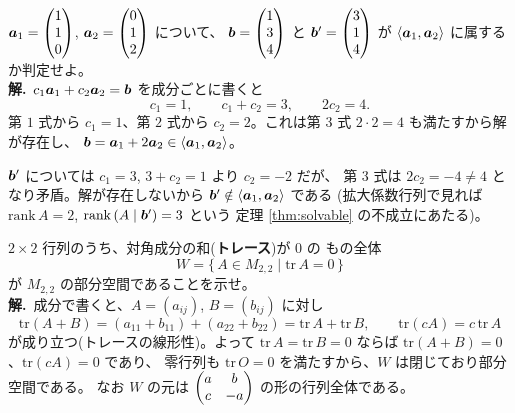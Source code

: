 \begin{rei}[例題・基本(生成された空間に入るか)]\label{rei:sub-member}
$\bm{a}_1 = \begin{pmatrix}1 \\ 1 \\ 0\end{pmatrix}$, $\bm{a}_2 = \begin{pmatrix}0 \\ 1 \\ 2\end{pmatrix}$ について、
$\bm{b} = \begin{pmatrix}1 \\ 3 \\ 4\end{pmatrix}$ と $\bm{b}' = \begin{pmatrix}3 \\ 1 \\ 4\end{pmatrix}$ が
$\langle \bm{a}_1, \bm{a}_2 \rangle$ に属するか判定せよ。\\
\textbf{解.}\ $c_1\bm{a}_1 + c_2\bm{a}_2 = \bm{b}$ を成分ごとに書くと
\[
c_1 = 1, \qquad c_1 + c_2 = 3, \qquad 2c_2 = 4.
\]
第 $1$ 式から $c_1 = 1$、第 $2$ 式から $c_2 = 2$。これは第 $3$ 式
$2 \cdot 2 = 4$ も満たすから解が存在し、
$\bm{b} = \bm{a}_1 + 2\bm{a}_2 \in \langle \bm{a}_1, \bm{a}_2 \rangle$。

$\bm{b}'$ については $c_1 = 3$, $3 + c_2 = 1$ より $c_2 = -2$ だが、
第 $3$ 式は $2c_2 = -4 \neq 4$ となり矛盾。解が存在しないから
$\bm{b}' \notin \langle \bm{a}_1, \bm{a}_2 \rangle$ である
(拡大係数行列で見れば
$\mathrm{rank}\,A = 2$, $\mathrm{rank}\,(A \mid \bm{b}') = 3$ という
定理 \ref{thm:solvable} の不成立にあたる)。
\end{rei}

\begin{rei}[例題・標準(行列の空間の部分空間)]\label{rei:sub-trace}
$2 \times 2$ 行列のうち、対角成分の和(\textbf{トレース})が $0$ の
もの全体
\[
W = \{\, A \in M_{2,2} \mid \mathrm{tr}\,A = 0 \,\}
\]
が $M_{2,2}$ の部分空間であることを示せ。\\
\textbf{解.}\ 成分で書くと、$A = (a_{ij})$, $B = (b_{ij})$ に対し
\[
\mathrm{tr}(A + B) = (a_{11} + b_{11}) + (a_{22} + b_{22})
= \mathrm{tr}\,A + \mathrm{tr}\,B, \qquad
\mathrm{tr}(cA) = c\,\mathrm{tr}\,A
\]
が成り立つ(トレースの線形性)。よって
$\mathrm{tr}\,A = \mathrm{tr}\,B = 0$ ならば
$\mathrm{tr}(A + B) = 0$、$\mathrm{tr}(cA) = 0$ であり、
零行列も $\mathrm{tr}\,O = 0$ を満たすから、$W$ は閉じており部分空間である。
なお $W$ の元は $\begin{pmatrix}a & b \\ c & -a\end{pmatrix}$ の形の行列全体である。
\end{rei}

